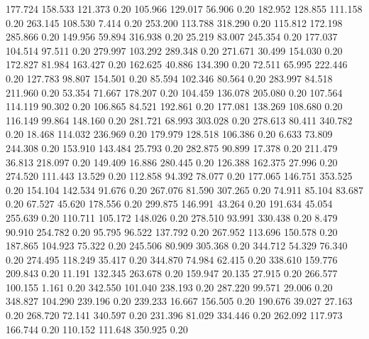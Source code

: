  177.724  158.533  121.373         0.20
 105.966  129.017   56.906         0.20
 182.952  128.855  111.158         0.20
 263.145  108.530    7.414         0.20
 253.200  113.788  318.290         0.20
 115.812  172.198  285.866         0.20
 149.956   59.894  316.938         0.20
  25.219   83.007  245.354         0.20
 177.037  104.514   97.511         0.20
 279.997  103.292  289.348         0.20
 271.671   30.499  154.030         0.20
 172.827   81.984  163.427         0.20
 162.625   40.886  134.390         0.20
  72.511   65.995  222.446         0.20
 127.783   98.807  154.501         0.20
  85.594  102.346   80.564         0.20
 283.997   84.518  211.960         0.20
  53.354   71.667  178.207         0.20
 104.459  136.078  205.080         0.20
 107.564  114.119   90.302         0.20
 106.865   84.521  192.861         0.20
 177.081  138.269  108.680         0.20
 116.149   99.864  148.160         0.20
 281.721   68.993  303.028         0.20
 278.613   80.411  340.782         0.20
  18.468  114.032  236.969         0.20
 179.979  128.518  106.386         0.20
   6.633   73.809  244.308         0.20
 153.910  143.484   25.793         0.20
 282.875   90.899   17.378         0.20
 211.479   36.813  218.097         0.20
 149.409   16.886  280.445         0.20
 126.388  162.375   27.996         0.20
 274.520  111.443   13.529         0.20
 112.858   94.392   78.077         0.20
 177.065  146.751  353.525         0.20
 154.104  142.534   91.676         0.20
 267.076   81.590  307.265         0.20
  74.911   85.104   83.687         0.20
  67.527   45.620  178.556         0.20
 299.875  146.991   43.264         0.20
 191.634   45.054  255.639         0.20
 110.711  105.172  148.026         0.20
 278.510   93.991  330.438         0.20
   8.479   90.910  254.782         0.20
  95.795   96.522  137.792         0.20
 267.952  113.696  150.578         0.20
 187.865  104.923   75.322         0.20
 245.506   80.909  305.368         0.20
 344.712   54.329   76.340         0.20
 274.495  118.249   35.417         0.20
 344.870   74.984   62.415         0.20
 338.610  159.776  209.843         0.20
  11.191  132.345  263.678         0.20
 159.947   20.135   27.915         0.20
 266.577  100.155    1.161         0.20
 342.550  101.040  238.193         0.20
 287.220   99.571   29.006         0.20
 348.827  104.290  239.196         0.20
 239.233   16.667  156.505         0.20
 190.676   39.027   27.163         0.20
 268.720   72.141  340.597         0.20
 231.396   81.029  334.446         0.20
 262.092  117.973  166.744         0.20
 110.152  111.648  350.925         0.20
